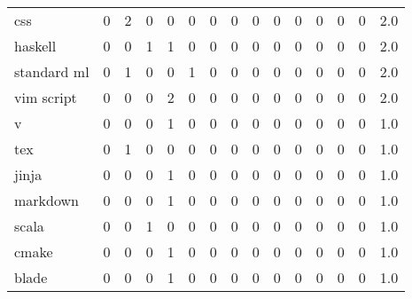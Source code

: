 \begin{tabular}{lrrrrrrrrrrrrrr}
css              &        0 &       2 &          0 &               0 &                0 &       0 &          0 &          0 &         0 &         0 &      0 &             0 &         0 &      2.0 \\
haskell          &        0 &       0 &          1 &               1 &                0 &       0 &          0 &          0 &         0 &         0 &      0 &             0 &         0 &      2.0 \\
standard ml      &        0 &       1 &          0 &               0 &                1 &       0 &          0 &          0 &         0 &         0 &      0 &             0 &         0 &      2.0 \\
vim script       &        0 &       0 &          0 &               2 &                0 &       0 &          0 &          0 &         0 &         0 &      0 &             0 &         0 &      2.0 \\
v                &        0 &       0 &          0 &               1 &                0 &       0 &          0 &          0 &         0 &         0 &      0 &             0 &         0 &      1.0 \\
tex              &        0 &       1 &          0 &               0 &                0 &       0 &          0 &          0 &         0 &         0 &      0 &             0 &         0 &      1.0 \\
jinja            &        0 &       0 &          0 &               1 &                0 &       0 &          0 &          0 &         0 &         0 &      0 &             0 &         0 &      1.0 \\
markdown         &        0 &       0 &          0 &               1 &                0 &       0 &          0 &          0 &         0 &         0 &      0 &             0 &         0 &      1.0 \\
scala            &        0 &       0 &          1 &               0 &                0 &       0 &          0 &          0 &         0 &         0 &      0 &             0 &         0 &      1.0 \\
cmake            &        0 &       0 &          0 &               1 &                0 &       0 &          0 &          0 &         0 &         0 &      0 &             0 &         0 &      1.0 \\
blade            &        0 &       0 &          0 &               1 &                0 &       0 &          0 &          0 &         0 &         0 &      0 &             0 &         0 &      1.0 \\

\end{tabular}
